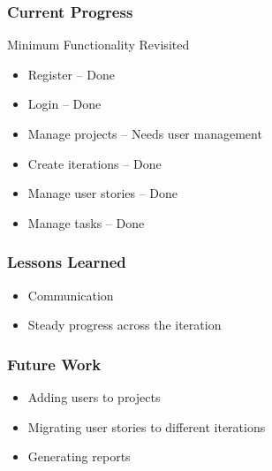 \documentclass[final]{beamer}
\begin{document}
\begin{frame}
	\frametitle{Current Progress}
	\begin{beamerboxesrounded}[shadow]{Minimum Functionality Revisited}
		\begin{itemize}
			\item{Register -- Done}
			\item{Login -- Done}
			\item{Manage projects -- Needs user management}
			\item{Create iterations -- Done}
			\item{Manage user stories -- Done}
			\item{Manage tasks -- Done}
		\end{itemize}
	\end{beamerboxesrounded}
\end{frame}

\begin{frame}
	\frametitle{Lessons Learned}
	\begin{beamerboxesrounded}[shadow]{}
		\begin{itemize}
			\item{Communication}
			\item{Steady progress across the iteration}
		\end{itemize}
	\end{beamerboxesrounded}
\end{frame}

\begin{frame}
	\frametitle{Future Work}
	\begin{beamerboxesrounded}[shadow]{}
		\begin{itemize}
			\item{Adding users to projects}
			\item{Migrating user stories to different iterations}
			\item{Generating reports}
		\end{itemize}
	\end{beamerboxesrounded}
\end{frame}
\end{document}
